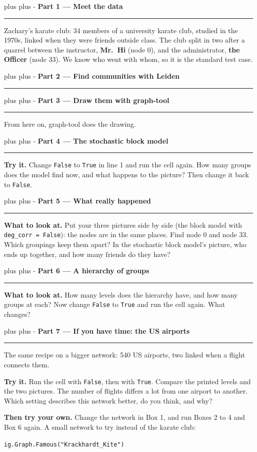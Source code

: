 \documentclass[a4paper, 12pt]{extarticle}
\newcommand{\needroom}[1]{%
  \par
  \begingroup
    \setlength{\dimen0}{#1}%
    \vskip 0pt plus \dimen0
    \penalty -100%
    \vskip 0pt plus -\dimen0
  \endgroup}
\newcommand{\parthead}[2]{%
  \needroom{5\baselineskip}%
  \vspace{0.5em}
  {\large\bfseries Part #1 --- #2}\par
  \vspace{-0.4em}\rule{\textwidth}{0.8pt}\par
  \vspace{0.1em}}
\begin{document}
\parthead{1}{Meet the data}

Zachary's karate club: 34 members of a university karate club, studied in the 1970s,
linked when they were friends outside class. The club split in two after a quarrel
between the instructor, \textbf{Mr.\ Hi} (node 0), and the administrator, \textbf{the
Officer} (node 33). We know who went with whom, so it is the standard test case.



\parthead{2}{Find communities with Leiden}



\parthead{3}{Draw them with graph-tool}

From here on, graph-tool does the drawing.



\parthead{4}{The stochastic block model}



\textbf{Try it.} Change \texttt{False} to \texttt{True} in line 1 and run the cell
again. How many groups does the model find now, and what happens to the picture?
Then change it back to \texttt{False}.

\parthead{5}{What really happened}



\textbf{What to look at.} Put your three pictures side by side (the block model with
\texttt{deg\_corr = False}): the nodes are in the same places. Find node 0 and node 33. Which groupings keep them apart? In the
stochastic block model's picture, who ends up together, and how many friends do they have?

\parthead{6}{A hierarchy of groups}



\textbf{What to look at.} How many levels does the hierarchy have, and how many groups
at each? Now change \texttt{False} to \texttt{True} and run the cell again. What changes?

\parthead{7}{If you have time: the US airports}

The same recipe on a bigger network: 540 US airports, two linked when a flight
connects them.



\textbf{Try it.} Run the cell with \texttt{False}, then with \texttt{True}. Compare the
printed levels and the two pictures. The number of flights differs a lot from one
airport to another. Which setting describes this network better, do you think, and why?

\textbf{Then try your own.} Change the network in Box 1, and run Boxes 2 to 4 and
Box 6 again. A small network to try instead of the karate club:

\hspace*{1.4em}\texttt{ig.Graph.Famous("Krackhardt\_Kite")}
\end{document}
